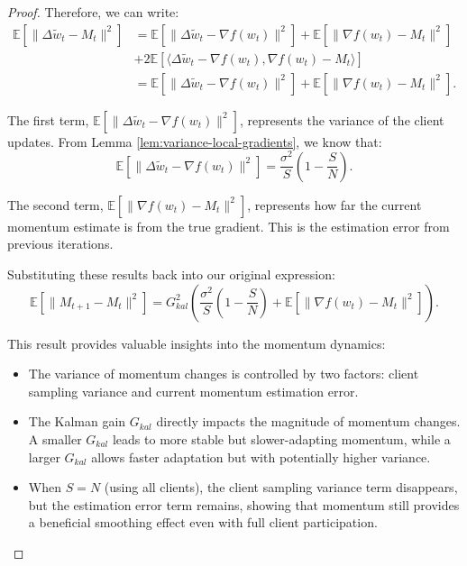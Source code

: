 \begin{proof}
    Therefore, we can write:
    \begin{align*}
        \mathbb{E}[\|\Delta \tilde{w}_t - M_t\|^2] &= \mathbb{E}[\|\Delta \tilde{w}_t - \nabla f(w_t)\|^2] + \mathbb{E}[\|\nabla f(w_t) - M_t\|^2] \\
        &+ 2\mathbb{E}[\langle \Delta \tilde{w}_t - \nabla f(w_t), \nabla f(w_t) - M_t \rangle] \\
        &= \mathbb{E}[\|\Delta \tilde{w}_t - \nabla f(w_t)\|^2] + \mathbb{E}[\|\nabla f(w_t) - M_t\|^2].
    \end{align*}
    
    The first term, \(\mathbb{E}[\|\Delta \tilde{w}_t - \nabla f(w_t)\|^2]\), represents the variance of the client updates. From Lemma \ref{lem:variance-local-gradients}, we know that:
    \[
        \mathbb{E}[\|\Delta \tilde{w}_t - \nabla f(w_t)\|^2] = \frac{\sigma^2}{S} \left(1 - \frac{S}{N}\right).
    \]
    
    The second term, \(\mathbb{E}[\|\nabla f(w_t) - M_t\|^2]\), represents how far the current momentum estimate is from the true gradient. This is the estimation error from previous iterations.
    
    Substituting these results back into our original expression:
    \[
        \mathbb{E}[\|M_{t+1} - M_t\|^2] = G_{kal}^2 \left( \frac{\sigma^2}{S} \left(1 - \frac{S}{N}\right) + \mathbb{E}[\|\nabla f(w_t) - M_t\|^2] \right).
    \]
    
    This result provides valuable insights into the momentum dynamics:
    \begin{itemize}
        \item The variance of momentum changes is controlled by two factors: client sampling variance and current momentum estimation error.
        \item The Kalman gain \(G_{kal}\) directly impacts the magnitude of momentum changes. A smaller \(G_{kal}\) leads to more stable but slower-adapting momentum, while a larger \(G_{kal}\) allows faster adaptation but with potentially higher variance.
        \item When \(S = N\) (using all clients), the client sampling variance term disappears, but the estimation error term remains, showing that momentum still provides a beneficial smoothing effect even with full client participation.
    \end{itemize}
\end{proof}

